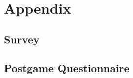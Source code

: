 \chapter{Appendix}\label{chap:appendix}
\section{Survey}\label{app:survey}

\section{Postgame Questionnaire}\label{app:postgame}
